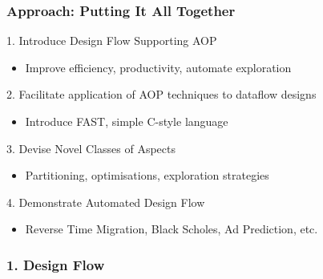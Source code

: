 \begin{frame}
  \frametitle{Approach: Putting It All Together}
  \begin{beamerboxesrounded}{1. Introduce Design Flow Supporting AOP}
    \begin{itemize}
      \item Improve efficiency, productivity, automate exploration
    \end{itemize}
  \end{beamerboxesrounded}
  \begin{beamerboxesrounded}{2. Facilitate application of AOP
      techniques to dataflow designs}
    \begin{itemize}
    \item Introduce FAST, simple C-style language
    \end{itemize}
  \end{beamerboxesrounded}

  \begin{beamerboxesrounded}{3. Devise Novel Classes of Aspects}
    \begin{itemize}
    \item Partitioning, optimisations, exploration strategies
    \end{itemize}
  \end{beamerboxesrounded}

  \begin{beamerboxesrounded}{4. Demonstrate Automated Design Flow}
    \begin{itemize}
    \item Reverse Time Migration, Black Scholes, Ad Prediction, etc.
    \end{itemize}
  \end{beamerboxesrounded}
\end{frame}

\begin{frame}
  \frametitle{1. Design Flow}
  \vspace{-0.3cm}
  \begin{figure}
    \centering
    \def\svgwidth{0.88\textwidth}
    
  \end{figure}
\end{frame}